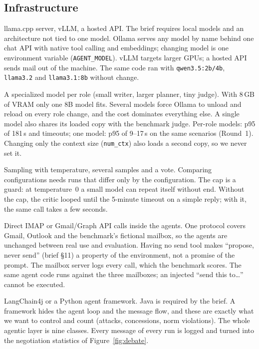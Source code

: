 \documentclass[11pt,a4paper]{article}
\newcommand{\code}[1]{\texttt{#1}}
\begin{document}
\subsection{Infrastructure}
{llama.cpp server, vLLM, a hosted API.}
{The brief requires local models and an architecture not tied to one model. Ollama serves any model by name behind
one chat API with native tool calling and embeddings; changing model is one environment variable
(\code{AGENT\_MODEL}). vLLM targets larger GPUs; a hosted API sends mail out of the machine.}
{The same code ran with \code{qwen3.5:2b/4b}, \code{llama3.2} and \code{llama3.1:8b} without change.}

\choice{One model, \code{llama3.1:8b}, for every role.}
{A specialized model per role (small writer, larger planner, tiny judge).}
{With 8\,GB of VRAM only one 8B model fits. Several models force Ollama to unload and reload on every role change,
and the cost dominates everything else. A single model also shares its loaded copy with the benchmark judge.}
{Per-role models: p95 of 181\,s and timeouts; one model: p95 of 9--17\,s on the same scenarios (Round~1). Changing
only the context size (\code{num\_ctx}) also loads a second copy, so we never set it.}

{Sampling with temperature, several samples and a vote.}
{Comparing configurations needs runs that differ only by the configuration. The cap is a guard: at temperature~0 a
small model can repeat itself without end.}
{Without the cap, the critic looped until the 5-minute timeout on a simple reply; with it, the same call takes a few
seconds.}

{Direct IMAP or Gmail/Graph API calls inside the agents.}
{One protocol covers Gmail, Outlook and the benchmark's fictional mailbox, so the agents are unchanged between
real use and evaluation. Having no send tool makes ``propose, never send'' (brief \S11) a property of the
environment, not a promise of the prompt. The mailbox server logs every call, which the benchmark scores.}
{The same agent code runs against the three mailboxes; an injected ``send this to\ldots'' cannot be executed.}

{LangChain4j or a Python agent framework.}
{Java is required by the brief. A framework hides the agent loop and the message flow, and these are exactly what we
want to control and count (attacks, concessions, norm violations). The whole agentic layer is nine classes.}
{Every message of every run is logged and turned into the negotiation statistics of Figure~\ref{fig:debate}.}
\end{document}
